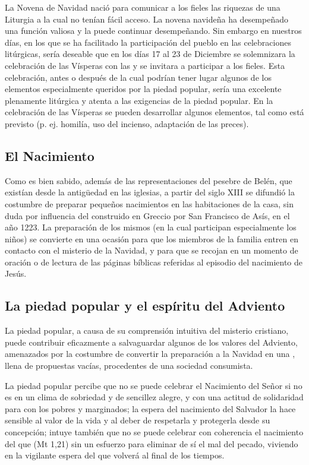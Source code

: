 \begin{introstyle}
	La Novena de Navidad nació para comunicar a los fieles las riquezas de una Liturgia a la cual no tenían fácil acceso. La novena navideña ha desempeñado una función valiosa y la puede continuar desempeñando. Sin	embargo en nuestros días, en los que se ha facilitado la participación del pueblo en las celebraciones litúrgicas, sería deseable que en los	días 17 al 23 de Diciembre se solemnizara la celebración de las Vísperas con las  y se invitara a participar a los fieles. Esta celebración, antes o después de la cual podrían tener lugar algunos	de los elementos especialmente queridos por la piedad popular, sería una excelente  plenamente litúrgica y atenta a las	exigencias de la piedad popular. En la celebración de las Vísperas se pueden desarrollar algunos elementos, tal como está previsto (p. ej. homilía, uso del incienso, adaptación de las preces).
	
	
	\subsection{El Nacimiento}
	
	Como es bien sabido, además de las representaciones del pesebre de	Belén, que existían desde la antigüedad en las iglesias, a partir del siglo XIII se difundió la costumbre de preparar pequeños nacimientos en las habitaciones de la casa, sin duda por influencia del 	construido en Greccio por San Francisco de Asís, en el año 1223. La
	preparación de los mismos (en la cual participan especialmente los niños) se convierte en una ocasión para que los miembros de la familia	entren en contacto con el misterio de la Navidad, y para que se recojan en un momento de oración o de lectura de las páginas bíblicas referidas al episodio del nacimiento de Jesús.
	
	
	\subsection{La piedad popular y el espíritu del Adviento}
	
	La piedad popular, a causa de su comprensión intuitiva del misterio cristiano, puede contribuir eficazmente a salvaguardar algunos de los valores del Adviento, amenazados por la costumbre de convertir la preparación a la Navidad en una , llena de propuestas vacías, procedentes de una sociedad consumista.
	
	La piedad popular percibe que no se puede celebrar el Nacimiento del Señor si no es en un clima de sobriedad y de sencillez alegre, y con una	actitud de solidaridad para con los pobres y marginados; la espera del nacimiento del Salvador la hace sensible al valor de la vida y al deber	de respetarla y protegerla desde su concepción; intuye también que no se
	puede celebrar con coherencia el nacimiento del que  (Mt 1,21) sin un esfuerzo para eliminar de sí el mal del pecado, viviendo en la vigilante espera del que volverá al final de los tiempos.
	

\end{introstyle}
